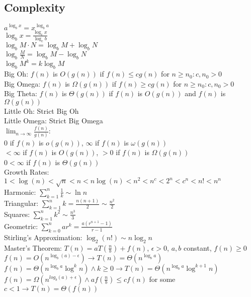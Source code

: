 \documentclass{article}
\begin{document}
\begin{multicols*}{2}
        \subsection*{Complexity}
        $a^{\log_b x} = x^{\log_b a}$\\
        $\log_b x = \frac{\log_c x}{\log_c b}$\\
        $\log_b M \cdot N = \log_b M + \log_b N$\\
        $\log_b \frac{M}{N} = \log_b M - \log_b N$\\
        $\log_b M^k = k\log_b M$\\
        Big Oh: $f(n)$ is $O(g(n))$ if $f(n) \leq cg(n)$ for $n \geq n_0 : c, n_0 > 0$\\
        Big Omega: $f(n)$ is $\Omega(g(n))$ if $f(n) \geq cg(n)$ for $n \geq n_0 : c, n_0 > 0$\\
        Big Theta: $f(n)$ is $\Theta(g(n))$ if $f(n)$ is $O(g(n))$ and $f(n)$ is $\Omega(g(n))$\\
        Little Oh: Strict Big Oh\\
        Little Omega: Strict Big Omega\\
        $\lim_{n\to\infty}\frac{f(n)}{g(n)}$:\\
        0 if $f(n)$ is $o(g(n))$, $\infty$ if $f(n)$ is $\omega(g(n))$\\
        $< \infty$ if $f(n)$ is $O(g(n))$, $> 0$ if $f(n)$ is $\Omega(g(n))$\\
        $0 < \infty$ if $f(n)$ is $\Theta(g(n))$\\
        Growth Rates: $1 < \log(n) < \sqrt{n} < n < n\log(n) < n^2 < n^c < 2^n < c^n < n! < n^n$\\
        Harmonic: $\sum_{k=1}^{n} \frac{1}{k} \sim \ln n$\\
        Triangular: $\sum_{k=1}^{n} k = \frac{n(n + 1)}{2} \sim \frac{n^2}{2}$\\
        Squares: $\sum_{k=1}^{n} k^2 \sim \frac{n^3}{3}$\\
        Geometric: $\sum_{k=0}^{n} ar^k = \frac{a(r^{n+1} - 1)}{r - 1}$\\
        Stirling's Approximation: $\log_2(n!) \sim n\log_2 n$\\
        Master's Theorem: $T(n) = aT(\frac{n}{b}) + f(n)$, $\epsilon > 0$, $a,b$ constant, $f(n
        ) \geq 0$\\
        $f(n) = O(n^{\log_b (a) - \epsilon}) \to T(n) = \Theta(n^{\log_b a})$\\
        $f(n) = \Theta(n^{\log_b a}\log^k n) \wedge k \geq 0 \to T(n) =
        \Theta(n^{\log_b a}\log^{k+1}n)$\\
        $f(n) = \Omega(n^{log_b (a) + \epsilon}) \wedge af(\frac{n}{b}) \leq cf(n)$ for some $c
        < 1 \to T(n) = \Theta(f(n))$

\end{multicols*}
\end{document}
